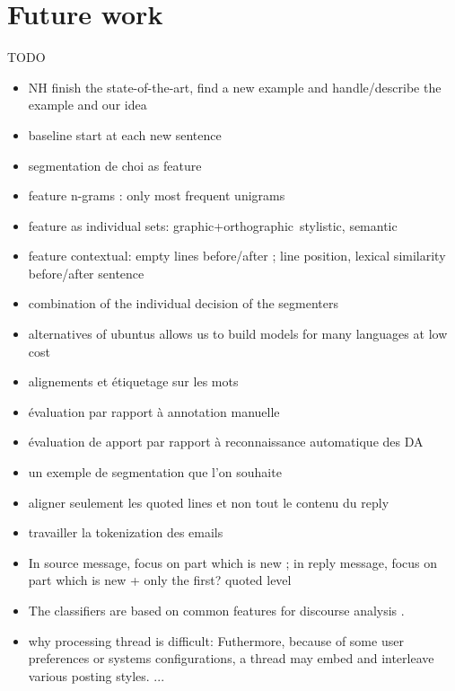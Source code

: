 

\section{Future work}
\label{sec:futureWork}

TODO

\begin{itemize}
\item NH finish the state-of-the-art, find a new example and handle/describe the example and our idea
\item baseline start at each new sentence
\item segmentation de choi as feature
\item feature n-grams : only most frequent unigrams
\item feature as individual sets: graphic+orthographic~stylistic, semantic
\item feature contextual: empty lines before/after ; line position, lexical similarity before/after sentence
\item combination of the individual decision of the segmenters
\item alternatives of ubuntus allows us to build models for many languages at low cost
\item alignements et étiquetage sur les mots
\item évaluation par rapport à annotation manuelle
\item évaluation de apport par rapport à reconnaissance automatique des DA 
\item un exemple de segmentation que l'on souhaite
\item aligner seulement les quoted lines et non tout le contenu du reply
\item travailler la tokenization des emails
\item In source message, focus on part which is new ; in reply message, focus on part which is new + only the first? quoted level 
\item The classifiers are based on common features for discourse analysis \cite{joty:2013:acl}.
\item why processing thread is difficult: Futhermore, because of some user preferences or systems configurations, a thread may embed and interleave various posting styles.  ...
 
\end{itemize}
